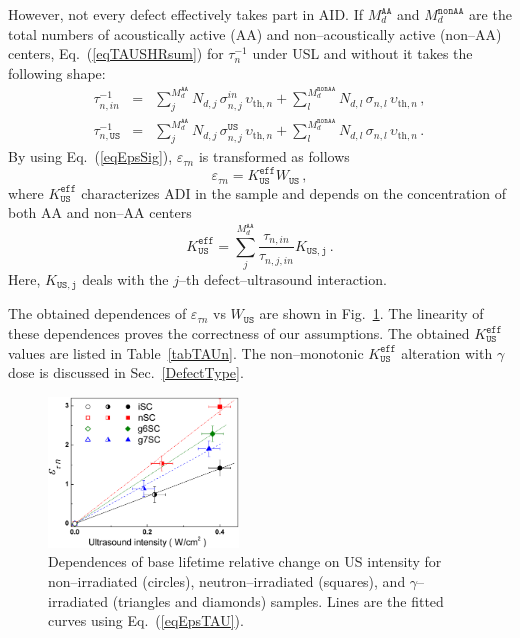 \documentclass[aip,jap, amsmath,amssymb,reprint]{revtex4-1}
\begin{document}
However, not every defect effectively takes part in AID.
If  $M_d^\mathtt{AA}$ and $M_d^\mathtt{nonAA}$ are the total numbers of acoustically active (AA) and non--acoustically active (non--AA) centers,
Eq.~(\ref{eqTAUSHRsum}) for $\tau_{n}^{-1}$ under USL and without it takes the following shape:
\begin{eqnarray}
\tau_{n,in}^{-1}&=&\sum_j^{M_d^\mathtt{AA}}N_{d,j}\,\sigma_{n,j}^{in}\,\upsilon_{\mathrm{th},n}+
\sum_l^{M_d^\mathtt{nonAA}}N_{d,l}\,\sigma_{n,l}\,\upsilon_{\mathrm{th},n}\,,\nonumber\\
\tau_{n,\mathtt{US}}^{-1}&=&\sum_j^{M_d^\mathtt{AA}}N_{d,j}\,\sigma_{n,j}^\mathtt{US}\,\upsilon_{\mathrm{th},n}+
\sum_l^{M_d^\mathtt{nonAA}}N_{d,l}\,\sigma_{n,l}\,\upsilon_{\mathrm{th},n}\,.\nonumber
\end{eqnarray}
By using Eq.~(\ref{eqEpsSig}), $\varepsilon_{\tau n}$  is transformed as follows
\begin{equation}
\label{eqEpsTAU}
\varepsilon_{\tau n}=K_\mathtt{US}^\mathtt{eff}W_\mathtt{US}\,,
\end{equation}
where $K_\mathtt{US}^\mathtt{eff}$ characterizes ADI in the sample
and depends on the concentration of both AA and non--AA centers
\begin{equation}
\label{eqKeff}
K_\mathtt{US}^\mathtt{eff}=\sum_j^{M_d^\mathtt{AA}}\frac{\tau_{n,in}}{\tau_{n,j,in}}K_\mathtt{US,j}\,.
\end{equation}
Here, $K_\mathtt{US,j}$ deals with the $j$--th defect--ultrasound interaction.

The obtained dependences of $\varepsilon_{\tau n}$ vs $W_\mathtt{US}$ are shown in Fig.~\ref{fig_Kus}.
The linearity of these dependences proves the correctness of our assumptions.
The obtained $K_\mathtt{US}^\mathtt{eff}$ values are listed in Table~\ref{tabTAUn}.
The non--monotonic $K_\mathtt{US}^\mathtt{eff}$ alteration with $\gamma$ dose
is discussed in Sec.~\ref{DefectType}.

\begin{figure}
\includegraphics[width=0.45\textwidth]{fig_8}%
\caption{\label{fig_Kus}
Dependences of base lifetime relative change on US intensity for non--irradiated (circles), neutron--irradiated (squares), and $\gamma$--irradiated
(triangles and diamonds) samples.
Lines are the fitted curves using Eq.~(\ref{eqEpsTAU}).
}%
\end{figure}
\end{document}
